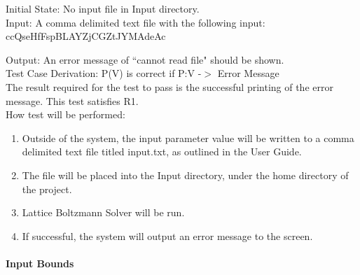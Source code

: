 \documentclass[12pt, titlepage]{article}
\newcommand{\famname}{Lattice Boltzmann Solver}
\begin{document}
\begin{enumerate}
Initial State: No input file in Input directory.\\

Input: A comma delimited text file with the following input:\\
ccQseHfFspBLAYZjCGZtJYMAdeAc

Output: An error message of ``cannot read file" should be shown.\\

Test Case Derivation: P(V) is correct if P:V -$>$ Error Message \\

The result required for the test to pass is the successful printing of the error message. This test satisfies R1.\\

How test will be performed: 

\begin{enumerate}
\item Outside of the system, the input parameter value will be written to a
  comma delimited text file titled input.txt, as outlined in the User Guide.
\item The file will be placed into the Input directory, under the home directory
  of the project.
\item {\famname} will be run.
\item If successful, the system will output an error message to the screen.
\end{enumerate}

\end{enumerate}
			
\paragraph{Input Bounds}
\end{document}
